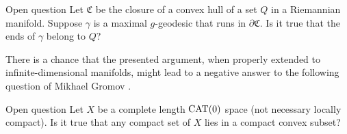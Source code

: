 \documentclass[a4paper,10pt]{article}
\begin{document}
\begin{thm}{Open question}
Let $\mathfrak{C}$ be the closure of a convex hull of a set $Q$ in a Riemannian manifold.
Suppose $\gamma$ is a maximal $g$-geodesic that runs in $\partial \mathfrak{C}$.
Is it true that the ends of $\gamma$ belong to $Q$?
\end{thm}

There is a chance that the presented argument, when properly extended to infinite-dimensional manifolds, might lead to a negative answer to the following question of Mikhael Gromov \cite[6.B\textsubscript{1}(f)]{gromov-1993}.

\begin{thm}{Open question}
Let $X$ be a complete length $\operatorname{\rm CAT}(0)$ space (not necessary locally compact).
Is it true that any compact set of $X$ lies in a compact convex subset?
\end{thm}


{\sloppy
\printbibliography[heading=bibintoc]
\fussy
}
\end{document}
